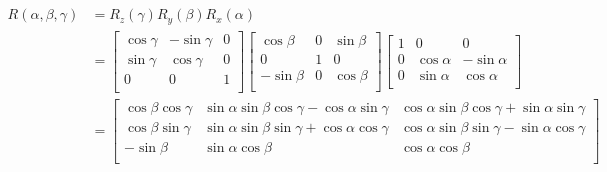 \documentclass[12pt, a4paper]{article}
\begin{document}
\begin{align*} \\
    R(\alpha, \beta, \gamma) & = R_z(\gamma) R_y(\beta) R_x(\alpha)                                                                                                \\
                             & = \begin{bmatrix}
                                     \cos \gamma & -\sin \gamma & 0 \\
                                     \sin \gamma & \cos \gamma  & 0 \\
                                     0           & 0            & 1 \\
                                 \end{bmatrix}
    \begin{bmatrix}
        \cos \beta  & 0 & \sin \beta \\
        0           & 1 & 0          \\
        -\sin \beta & 0 & \cos \beta \\
    \end{bmatrix}
    \begin{bmatrix}
        1 & 0           & 0            \\
        0 & \cos \alpha & -\sin \alpha \\
        0 & \sin \alpha & \cos \alpha  \\
    \end{bmatrix}                                                                                                                                 \\
                             & = \begin{bmatrix}
                                     \cos\beta\cos\gamma & \sin\alpha\sin\beta\cos\gamma - \cos\alpha\sin\gamma & \cos\alpha\sin\beta\cos\gamma + \sin\alpha\sin\gamma \\
                                     \cos\beta\sin\gamma & \sin\alpha\sin\beta\sin\gamma + \cos\alpha\cos\gamma & \cos\alpha\sin\beta\sin\gamma - \sin\alpha\cos\gamma \\
                                     -\sin\beta          & \sin\alpha\cos\beta                                  & \cos\alpha\cos\beta                                  \\
                                 \end{bmatrix}
\end{align*} \\
\end{document}
